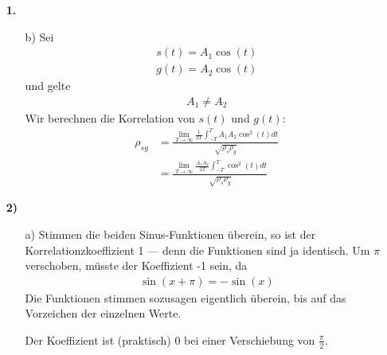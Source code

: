 \documentclass[a4paper,11pt]{article}
\author{\authorinfotitle}
\title{\titleinfo}
\date{\today}
\begin{document}
	\maketitle
	\begin{enumerate}
		\item[\textbf{1.}]
			\begin{enumerate}
				\item[b)]
					Sei
					\begin{align*}
						s(t) = A_1 \cos(t) \\
						g(t) = A_2 \cos(t)
					\end{align*}
					und gelte
					\begin{align}
						A_1 \neq A_2
					\end{align}
					Wir berechnen die Korrelation von $s(t)$ und $g(t)$:
					\begin{align*}
						\rho_{sg} &= \frac{\displaystyle \lim_{T \to \infty} \frac{1}{2T} \int_{-T}^T A_1 A_2 \cos^2(t) dt}{\sqrt{\rho_s\rho_g}} \\
								  &= \frac{\displaystyle \lim_{T \to \infty} \frac{A_1A_2}{2T} \int_{-T}^T \cos^2(t) dt}{\sqrt{\rho_s\rho_g}}
					\end{align*}
			\end{enumerate}

		\item[\textbf{2)}]
			\begin{enumerate}
				\item[a)]
					Stimmen die beiden Sinus-Funktionen überein, so ist der
					Korrelationzkoeffizient 1 --- denn die Funktionen sind ja
					identisch. Um $\pi$ verschoben, müsste der Koeffizient -1
					sein, da
					\begin{align*}
					\sin(x + \pi) = -\sin(x)
					\end{align*}
					Die Funktionen stimmen sozusagen eigentlich überein,
					bis auf das Vorzeichen der einzelnen Werte.

					Der Koeffizient ist (praktisch) 0 bei einer Verschiebung
					von $\frac{\pi}{2}$.
			\end{enumerate}
	\end{enumerate}
\end{document}
